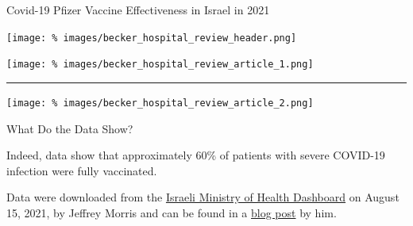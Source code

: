 \documentclass[8pt,aspectratio=169]{beamer}
\newcommand{\bs}{\vspace{\baselineskip}}
\begin{document}

\begin{frame}{Covid-19 Pfizer Vaccine Effectiveness in Israel in 2021}

  \begin{center}

    \begin{minipage}{.75\textwidth}

       \texttt{[image: \%
         images/becker\_hospital\_review\_header.png]}

       \centering

       \texttt{[image: \%
         images/becker\_hospital\_review\_article\_1.png]}

       \noindent\rule{\textwidth}{0.4pt}

       \texttt{[image: \%
         images/becker\_hospital\_review\_article\_2.png]}

    \end{minipage}

  \end{center}

\end{frame}


\begin{frame}{What Do the Data Show?}

  Indeed, data show that approximately 60\% of patients with severe COVID-19
  infection were fully vaccinated.

  \bs


  

  \bs

  Data were downloaded from the \href{\imhDashboardURL}{Israeli Ministry of
  Health Dashboard} on August 15, 2021, by Jeffrey Morris and can be found in a
  \href{\jmorrisBlogpostURL}{blog post} by him.

\end{frame}

\end{document}
